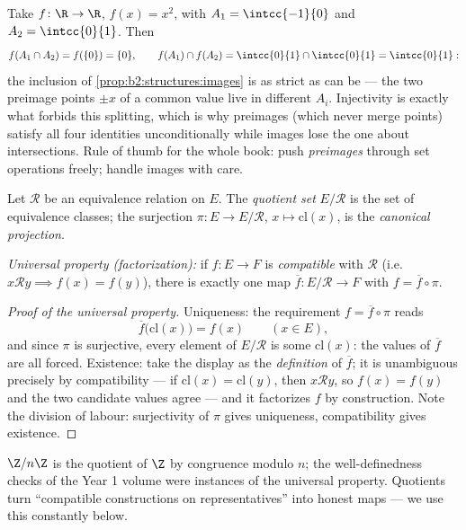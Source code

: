 \begin{example}\label{ex:b2:structures:imagestrict}
Take $f \colon \R \to \R$, $f(x) = x^2$, with $A_1 =
\intcc{-1}{0}$ and $A_2 = \intcc{0}{1}$. Then
\[
f(A_1 \cap A_2) = f(\{0\}) = \{0\},
\qquad
f(A_1) \cap f(A_2) = \intcc{0}{1} \cap \intcc{0}{1} =
\intcc{0}{1} :
\]
the inclusion of \cref{prop:b2:structures:images} is as strict
as can be --- the two preimage points $\pm x$ of a common value
live in different $A_i$. Injectivity is exactly what forbids
this splitting, which is why preimages (which never merge
points) satisfy all four identities unconditionally while
images lose the one about intersections. Rule of thumb for the
whole book: push \emph{preimages} through set operations
freely; handle images with care.
\end{example}

\begin{definition}\label{def:b2:structures:quotient}
Let $\mathcal{R}$ be an equivalence relation on $E$. The
\emph{quotient set} $E/\mathcal{R}$ is the set of
equivalence classes; the surjection $\pi \colon E \to E/\mathcal{R}$,
$x \mapsto \mathrm{cl}(x)$, is the \emph{canonical
projection}.

\emph{Universal property (factorization):} if $f \colon E \to F$ is
\emph{compatible} with $\mathcal{R}$ (i.e.\ $x \mathbin{\mathcal{R}}
y \implies f(x) = f(y)$), there is exactly one map $\overline f
\colon E/\mathcal{R} \to F$ with $f = \overline f \circ \pi$.
\end{definition}

\begin{proof}[Proof of the universal property]
Uniqueness: the requirement $f = \overline f \circ \pi$ reads
\[
\overline f\bigl(\mathrm{cl}(x)\bigr) = f(x)
\qquad (x \in E),
\]
and since $\pi$ is surjective, every element of
$E/\mathcal{R}$ is some $\mathrm{cl}(x)$: the values of
$\overline f$ are all forced. Existence: take the display as
the \emph{definition} of $\overline f$; it is unambiguous
precisely by compatibility --- if $\mathrm{cl}(x) =
\mathrm{cl}(y)$, then $x \mathbin{\mathcal{R}} y$, so $f(x) =
f(y)$ and the two candidate values agree --- and it factorizes
$f$ by construction. Note the division of labour: surjectivity
of $\pi$ gives uniqueness, compatibility gives existence.
\end{proof}

\begin{example}
$\Z/n\Z$ is the quotient of $\Z$ by congruence modulo $n$; the
well-definedness checks of the Year 1 volume were instances of the
universal property. Quotients turn ``compatible constructions on
representatives'' into honest maps --- we use this constantly below.
\end{example}

